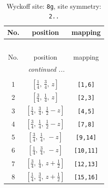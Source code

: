 \documentclass[fleqn,8pt]{jsarticle}
\begin{document}
\renewcommand{\arraystretch}{1.2}
\begin{longtable}{ccc}
\caption{Wyckoff site: {\tt 8g}, site symmetry: {\tt 2..}}
 \\
 \hline \hline
No. & position & mapping \\ \hline \endfirsthead

\multicolumn{2}{l}{\tablename\ \thetable{}} \\
 \hline \hline
No. & position & mapping \\ \hline \endhead

 \hline \hline
\multicolumn{2}{r}{\footnotesize\it continued ...} \\ \endfoot

 \hline \hline
\multicolumn{2}{r}{} \\ \endlastfoot

1 & $\left[ \frac{1}{4},\, \frac{3}{4},\, z \right]$ & {\tt [1,6]} \\ \hline
2 & $\left[ \frac{3}{4},\, \frac{1}{4},\, z \right]$ & {\tt [2,3]} \\ \hline
3 & $\left[ \frac{1}{4},\, \frac{3}{4},\, \frac{1}{2} - z \right]$ & {\tt [4,5]} \\ \hline
4 & $\left[ \frac{3}{4},\, \frac{1}{4},\, \frac{1}{2} - z \right]$ & {\tt [7,8]} \\ \hline
5 & $\left[ \frac{3}{4},\, \frac{1}{4},\, - z \right]$ & {\tt [9,14]} \\ \hline
6 & $\left[ \frac{1}{4},\, \frac{3}{4},\, - z \right]$ & {\tt [10,11]} \\ \hline
7 & $\left[ \frac{3}{4},\, \frac{1}{4},\, z + \frac{1}{2} \right]$ & {\tt [12,13]} \\ \hline
8 & $\left[ \frac{1}{4},\, \frac{3}{4},\, z + \frac{1}{2} \right]$ & {\tt [15,16]} \\
\end{longtable}
\renewcommand{\arraystretch}{1.2}
\end{document}
